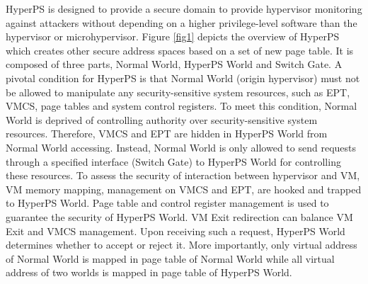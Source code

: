 \documentclass[conference]{IEEEtran}
\begin{document}

HyperPS is designed to provide a secure domain to provide hypervisor monitoring against attackers without depending on a higher privilege-level software than the hypervisor or microhypervisor. 
Figure \ref{fig1} depicts the overview of HyperPS which creates other secure address spaces based on a set of new page table. It is composed of three parts, Normal World, HyperPS World and Switch Gate. 
A pivotal condition for HyperPS is that Normal World (origin hypervisor) must not be allowed to manipulate any security-sensitive system resources, such as EPT, VMCS, page tables and system control registers.
To meet this condition, Normal World is deprived of controlling authority over security-sensitive system resources. Therefore, VMCS and EPT are hidden in HyperPS World from Normal World accessing. Instead, Normal World is only allowed to send requests through a specified interface (Switch Gate) to HyperPS World for controlling these resources.
 To assess the security of interaction between hypervisor and VM, VM memory mapping, management on VMCS and EPT, are hooked and trapped to HyperPS World. Page table and control register management is used to guarantee the security of HyperPS World.
VM Exit redirection can balance VM Exit and VMCS management. Upon receiving such a request, HyperPS World determines whether to accept or reject it. More importantly, only virtual address of Normal World is mapped in page table of Normal World while all virtual address of two worlds is mapped in page table of HyperPS World.

%
\end{document}
